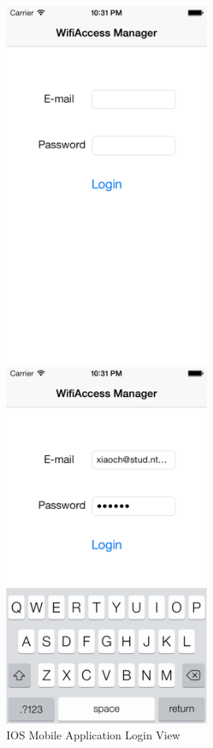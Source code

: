 \begin{figure}
	\centering
	\begin{minipage}{0.45\textwidth}
		\centering
    		\includegraphics[width=0.6\textwidth,natwidth=610,natheight=642]{figs/ios_app_login_page.png}
  		\caption{IOS Mobile Application Login View}
  		\label{fig:ios_login_page}
  	\end{minipage}
  	\hfill
  	\begin{minipage}{0.45\textwidth}
  		\centering
  		\includegraphics[width=0.6\textwidth,natwidth=610,natheight=642]{figs/ios_app_login_process.png}

\end{minipage}
\end{figure}
